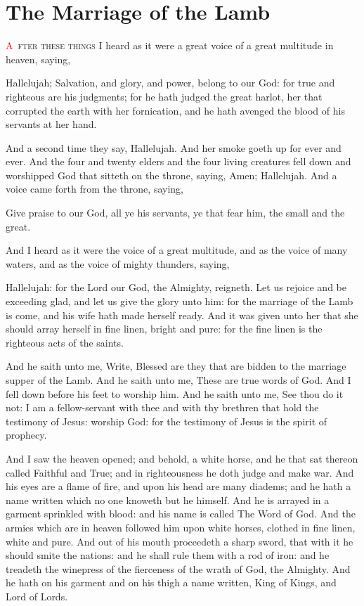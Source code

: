 
\chapter{The Marriage of the Lamb}
\lettrine[lines=3,slope=-0.5em]{\textcolor{red}{A}}{\ fter these things} I heard as it were a great voice of a great multitude in heaven, saying,

Hallelujah; Salvation, and glory, and power, belong to our God: 
 for true and righteous are his judgments; for he hath judged the great harlot, her that corrupted the earth with her fornication, and he hath avenged the blood of his servants at her hand.

 And a second time they say, Hallelujah. And her smoke goeth up for ever and ever. 
 And the four and twenty elders and the four living creatures fell down and worshipped God that sitteth on the throne, saying, Amen; Hallelujah. 
 And a voice came forth from the throne, saying,

Give praise to our God, all ye his servants, ye that fear him, the small and the great.

 And I heard as it were the voice of a great multitude, and as the voice of many waters, and as the voice of mighty thunders, saying,

Hallelujah: for the Lord our God, the Almighty, reigneth. 
 Let us rejoice and be exceeding glad, and let us give the glory unto him: for the marriage of the Lamb is come, and his wife hath made herself ready. 
 And it was given unto her that she should array herself in fine linen, bright and pure: for the fine linen is the righteous acts of the saints.

 And he saith unto me, Write, Blessed are they that are bidden to the marriage supper of the Lamb. And he saith unto me, These are true words of God. 
 And I fell down before his feet to worship him. And he saith unto me, See thou do it not: I am a fellow-servant with thee and with thy brethren that hold the testimony of Jesus: worship God: for the testimony of Jesus is the spirit of prophecy.

 And I saw the heaven opened; and behold, a white horse, and he that sat thereon called Faithful and True; and in righteousness he doth judge and make war. 
 And his eyes are a flame of fire, and upon his head are many diadems; and he hath a name written which no one knoweth but he himself. 
 And he is arrayed in a garment sprinkled with blood: and his name is called The Word of God. 
 And the armies which are in heaven followed him upon white horses, clothed in fine linen, white and pure. 
 And out of his mouth proceedeth a sharp sword, that with it he should smite the nations: and he shall rule them with a rod of iron: and he treadeth the winepress of the fierceness of the wrath of God, the Almighty. 
 And he hath on his garment and on his thigh a name written, King of Kings, and Lord of Lords.

